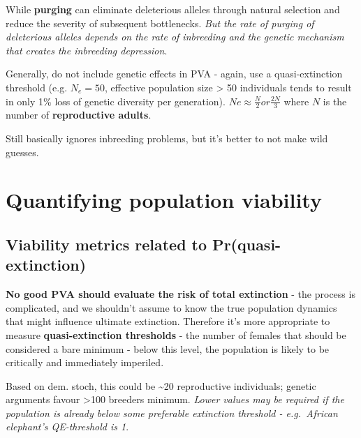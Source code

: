 \documentclass[]{article}
\begin{document}
While \textbf{purging} can eliminate deleterious alleles through natural
selection and reduce the severity of subsequent bottlenecks. \emph{But
the rate of purging of deleterious alleles depends on the rate of
inbreeding and the genetic mechanism that creates the inbreeding
depression}.

Generally, do not include genetic effects in PVA - again, use a
quasi-extinction threshold (e.g. \(N_e = 50\), effective population size
\textgreater{} 50 individuals tends to result in only 1\% loss of
genetic diversity per generation).
\(Ne \approx \frac{N}{2} or \frac{2N}{3}\) where \(N\) is the number of
\textbf{reproductive adults}.

Still basically ignores inbreeding problems, but it's better to not make
wild guesses.

\section{Quantifying population
viability}\label{quantifying-population-viability}

\subsection{Viability metrics related to
Pr(quasi-extinction)}\label{viability-metrics-related-to-prquasi-extinction}

\textbf{No good PVA should evaluate the risk of total extinction} - the
process is complicated, and we shouldn't assume to know the true
population dynamics that might influence ultimate extinction. Therefore
it's more appropriate to measure \textbf{quasi-extinction thresholds} -
the number of females that should be considered a bare minimum - below
this level, the population is likely to be critically and immediately
imperiled.

Based on dem. stoch, this could be \textasciitilde{}20 reproductive
individuals; genetic arguments favour \textgreater{}100 breeders
minimum. \emph{Lower values may be required if the population is already
below some preferable extinction threshold - e.g.~African elephant's
QE-threshold is 1}.
\end{document}
